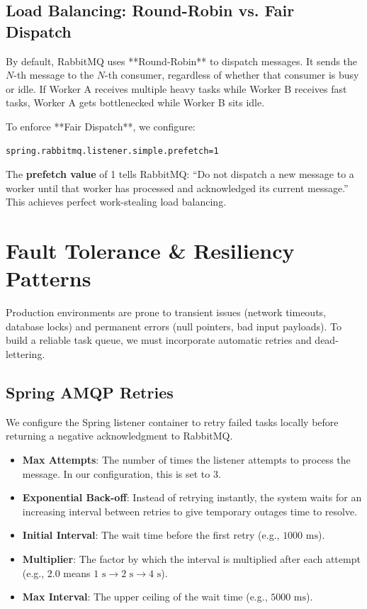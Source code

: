 \documentclass[11pt,a4paper]{article}
\begin{document}
\subsection{Load Balancing: Round-Robin vs. Fair Dispatch}
By default, RabbitMQ uses **Round-Robin** to dispatch messages. It sends the $N$-th message to the $N$-th consumer, regardless of whether that consumer is busy or idle. If Worker A receives multiple heavy tasks while Worker B receives fast tasks, Worker A gets bottlenecked while Worker B sits idle.

To enforce **Fair Dispatch**, we configure:
\begin{lstlisting}
spring.rabbitmq.listener.simple.prefetch=1
\end{lstlisting}
The \textbf{prefetch value} of 1 tells RabbitMQ: ``Do not dispatch a new message to a worker until that worker has processed and acknowledged its current message.'' This achieves perfect work-stealing load balancing.

\newpage
\section{Fault Tolerance \& Resiliency Patterns}

Production environments are prone to transient issues (network timeouts, database locks) and permanent errors (null pointers, bad input payloads). To build a reliable task queue, we must incorporate automatic retries and dead-lettering.

\subsection{Spring AMQP Retries}
We configure the Spring listener container to retry failed tasks locally before returning a negative acknowledgment to RabbitMQ.

\begin{itemize}
    \item \textbf{Max Attempts}: The number of times the listener attempts to process the message. In our configuration, this is set to 3.
    \item \textbf{Exponential Back-off}: Instead of retrying instantly, the system waits for an increasing interval between retries to give temporary outages time to resolve.
    \item \textbf{Initial Interval}: The wait time before the first retry (e.g., $1000\text{ ms}$).
    \item \textbf{Multiplier}: The factor by which the interval is multiplied after each attempt (e.g., $2.0$ means $1\text{ s} \rightarrow 2\text{ s} \rightarrow 4\text{ s}$).
    \item \textbf{Max Interval}: The upper ceiling of the wait time (e.g., $5000\text{ ms}$).
\end{itemize}
\end{document}
